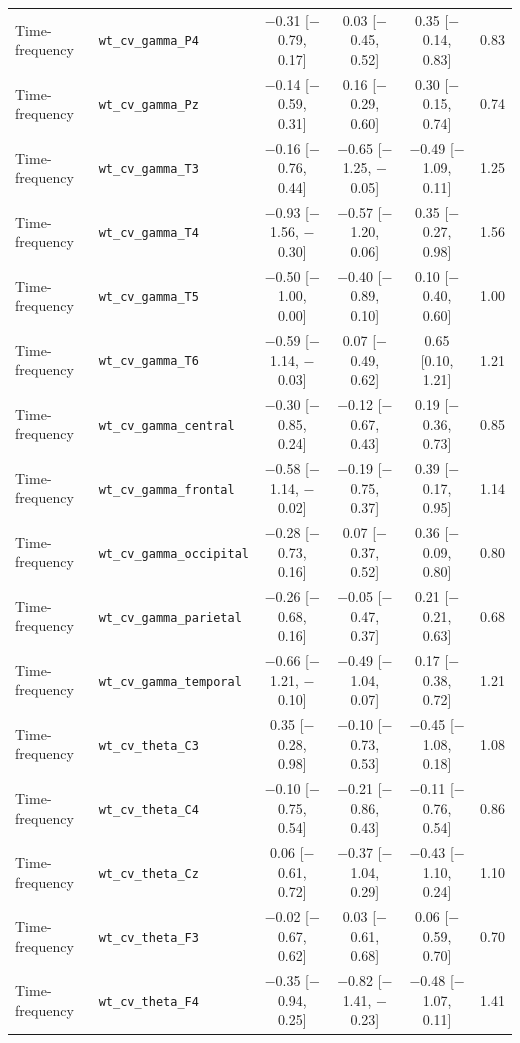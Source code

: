 {\begin{longtable}{llcccc}
Time-frequency & \texttt{wt\_cv\_gamma\_P4} & $-$0.31 [$-$0.79, 0.17] & 0.03 [$-$0.45, 0.52] & 0.35 [$-$0.14, 0.83] & 0.83 \\
Time-frequency & \texttt{wt\_cv\_gamma\_Pz} & $-$0.14 [$-$0.59, 0.31] & 0.16 [$-$0.29, 0.60] & 0.30 [$-$0.15, 0.74] & 0.74 \\
Time-frequency & \texttt{wt\_cv\_gamma\_T3} & $-$0.16 [$-$0.76, 0.44] & $-$0.65 [$-$1.25, $-$0.05] & $-$0.49 [$-$1.09, 0.11] & 1.25 \\
Time-frequency & \texttt{wt\_cv\_gamma\_T4} & $-$0.93 [$-$1.56, $-$0.30] & $-$0.57 [$-$1.20, 0.06] & 0.35 [$-$0.27, 0.98] & 1.56 \\
Time-frequency & \texttt{wt\_cv\_gamma\_T5} & $-$0.50 [$-$1.00, 0.00] & $-$0.40 [$-$0.89, 0.10] & 0.10 [$-$0.40, 0.60] & 1.00 \\
Time-frequency & \texttt{wt\_cv\_gamma\_T6} & $-$0.59 [$-$1.14, $-$0.03] & 0.07 [$-$0.49, 0.62] & 0.65 [0.10, 1.21] & 1.21 \\
Time-frequency & \texttt{wt\_cv\_gamma\_central} & $-$0.30 [$-$0.85, 0.24] & $-$0.12 [$-$0.67, 0.43] & 0.19 [$-$0.36, 0.73] & 0.85 \\
Time-frequency & \texttt{wt\_cv\_gamma\_frontal} & $-$0.58 [$-$1.14, $-$0.02] & $-$0.19 [$-$0.75, 0.37] & 0.39 [$-$0.17, 0.95] & 1.14 \\
Time-frequency & \texttt{wt\_cv\_gamma\_occipital} & $-$0.28 [$-$0.73, 0.16] & 0.07 [$-$0.37, 0.52] & 0.36 [$-$0.09, 0.80] & 0.80 \\
Time-frequency & \texttt{wt\_cv\_gamma\_parietal} & $-$0.26 [$-$0.68, 0.16] & $-$0.05 [$-$0.47, 0.37] & 0.21 [$-$0.21, 0.63] & 0.68 \\
Time-frequency & \texttt{wt\_cv\_gamma\_temporal} & $-$0.66 [$-$1.21, $-$0.10] & $-$0.49 [$-$1.04, 0.07] & 0.17 [$-$0.38, 0.72] & 1.21 \\
Time-frequency & \texttt{wt\_cv\_theta\_C3} & 0.35 [$-$0.28, 0.98] & $-$0.10 [$-$0.73, 0.53] & $-$0.45 [$-$1.08, 0.18] & 1.08 \\
Time-frequency & \texttt{wt\_cv\_theta\_C4} & $-$0.10 [$-$0.75, 0.54] & $-$0.21 [$-$0.86, 0.43] & $-$0.11 [$-$0.76, 0.54] & 0.86 \\
Time-frequency & \texttt{wt\_cv\_theta\_Cz} & 0.06 [$-$0.61, 0.72] & $-$0.37 [$-$1.04, 0.29] & $-$0.43 [$-$1.10, 0.24] & 1.10 \\
Time-frequency & \texttt{wt\_cv\_theta\_F3} & $-$0.02 [$-$0.67, 0.62] & 0.03 [$-$0.61, 0.68] & 0.06 [$-$0.59, 0.70] & 0.70 \\
Time-frequency & \texttt{wt\_cv\_theta\_F4} & $-$0.35 [$-$0.94, 0.25] & $-$0.82 [$-$1.41, $-$0.23] & $-$0.48 [$-$1.07, 0.11] & 1.41 \\

\end{longtable}}
